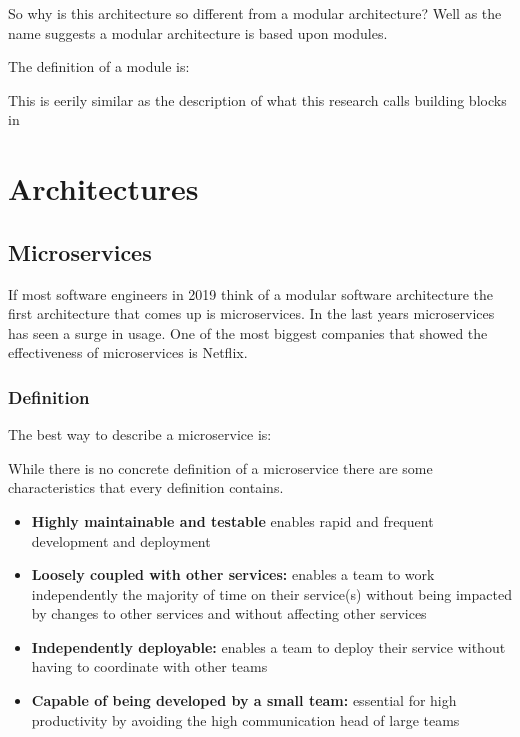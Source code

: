 So why is this architecture so different from a modular architecture? Well as the name suggests a modular architecture is based upon modules.

The definition of a module is:

This is eerily similar as the description of what this research calls building blocks in 

\section{Architectures}
\label{sec:Architectures}

\subsection{Microservices}
If most software engineers in 2019 think of a modular software architecture the first architecture that comes up is microservices. In the last years microservices has seen a surge in usage. One of the most biggest companies that showed the effectiveness of microservices is Netflix.

\subsubsection{Definition}
The best way to describe a microservice is:

While there is no concrete definition of a microservice there are some characteristics that
every definition contains.
\begin{itemize}
        \item \textbf{Highly maintainable and testable} enables rapid and frequent development and deployment

        \item \textbf{Loosely coupled with other services:} enables a team to work independently the majority of time on their service(s) without being impacted by changes to other services and without affecting other services

        \item \textbf{Independently deployable:} enables a team to deploy their service without having to coordinate with other teams

        \item \textbf{Capable of being developed by a small team:} essential for high productivity by avoiding the high communication head of large teams \cite{microservicesCharactaristics}
\end{itemize}


